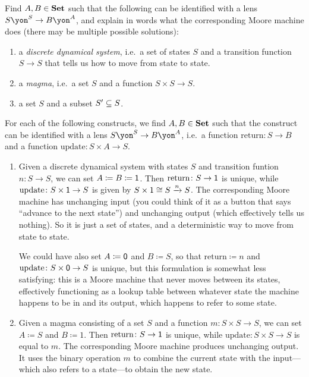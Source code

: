 \documentclass[Book-Poly]{subfiles}
\begin{document}
\begin{exercise}
Find $A,B\in\smset$ such that the following can be identified with a lens $S\yon^S\to B\yon^A$, and explain in words what the corresponding Moore machine does (there may be multiple possible solutions):
\begin{enumerate}
	\item a \emph{discrete dynamical system}, i.e.\ a set of states $S$ and a transition function $S\to S$ that tells us how to move from state to state.
	\item a \emph{magma}, i.e.\ a set $S$ and a function $S\times S\to S$.
	\item a set $S$ and a subset $S'\ss S$.\qedhere
\end{enumerate}
\begin{solution}
For each of the following constructs, we find $A, B \in \smset$ such that the construct can be identified with a lens $S\yon^S \to B\yon^A$, i.e.\ a function $\text{return} \colon S \to B$ and a function $\text{update} \colon S \times A \to S$.
\begin{enumerate}
    \item Given a discrete dynamical system with states $S$ and transition funtion $n \colon S \to S$, we can set $A \coloneqq B \coloneqq \1$.
    Then $\text{return} \colon S \to \1$ is unique, while $\text{update} \colon S \times \1 \to S$ is given by $S \times 1 \iso S \To{n} S$.
    The corresponding Moore machine has unchanging input (you could think of it as a button that says ``advance to the next state'') and unchanging output (which effectively tells us nothing).
    So it is just a set of states, and a deterministic way to move from state to state.

    We could have also set $A \coloneqq \0$ and $B \coloneqq S$, so that $\text{return} \coloneqq n$ and $\text{update} \colon S \times \0 \to S$ is unique, but this formulation is somewhat less satisfying: this is a Moore machine that never moves between its states, effectively functioning as a lookup table between whatever state the machine happens to be in and its output, which happens to refer to some state.

    \item Given a magma consisting of a set $S$ and a function $m \colon S \times S \to S$, we can set $A \coloneqq S$ and $B \coloneqq 1$.
    Then $\text{return} \colon S \to \1$ is unique, while $\text{update} \colon S \times S \to S$ is equal to $m$.
    The corresponding Moore machine produces unchanging output.
    It uses the binary operation $m$ to combine the current state with the input---which also refers to a state---to obtain the new state.


\end{enumerate}
\end{solution}
\end{exercise}
\end{document}
